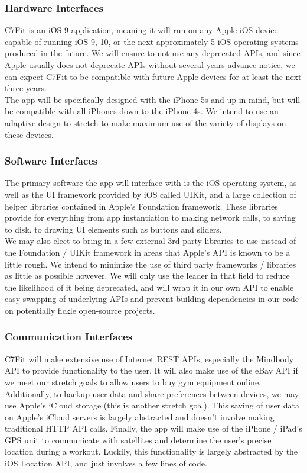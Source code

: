 \documentclass[letterpaper,10pt,titlepage]{article}
\begin{document}
\subsubsection{Hardware Interfaces}

C7Fit is an iOS 9 application, meaning it will run on any Apple iOS device capable of running iOS 9, 10, or the next approximately 5 iOS operating systems produced in the future. We will ensure to not use any deprecated APIs, and since Apple usually does not deprecate APIs without several years advance notice, we can expect C7Fit to be compatible with future Apple devices for at least the next three years.\\

The app will be specifically designed with the iPhone 5s and up in mind, but will be compatible with all iPhones down to the iPhone 4s. We intend to use an adaptive design to stretch to make maximum use of the variety of displays on these devices.

\subsubsection{Software Interfaces}

The primary software the app will interface with is the iOS operating system, as well as the UI framework provided by iOS called UIKit, and a large collection of helper libraries contained in Apple's Foundation framework. These libraries provide for everything from app instantiation to making network calls, to saving to disk, to drawing UI elements such as buttons and sliders.\\

We may also elect to bring in a few external 3rd party libraries to use instead of the Foundation / UIKit framework in areas that Apple's API is known to be a little rough. We intend to minimize the use of third party frameworks / libraries as little as possible however. We will only use the leader in that field to reduce the likelihood of it being deprecated, and will wrap it in our own API to enable easy swapping of underlying APIs and prevent building dependencies in our code on potentially fickle open-source projects.

\subsubsection{Communication Interfaces}

C7Fit will make extensive use of Internet REST APIs, especially the Mindbody API to provide functionality to the user. It will also make use of the eBay API if we meet our stretch goals to allow users to buy gym equipment online. Additionally, to backup user data and share preferences between devices, we may use Apple's iCloud storage (this is another stretch goal). This saving of user data on Apple's iCloud servers is largely abstracted and doesn't involve making traditional HTTP API calls. Finally, the app will make use of the iPhone / iPad's GPS unit to communicate with satellites and determine the user's precise location during a workout. Luckily, this functionality is largely abstracted by the iOS Location API, and just involves a few lines of code.\\
\end{document}
